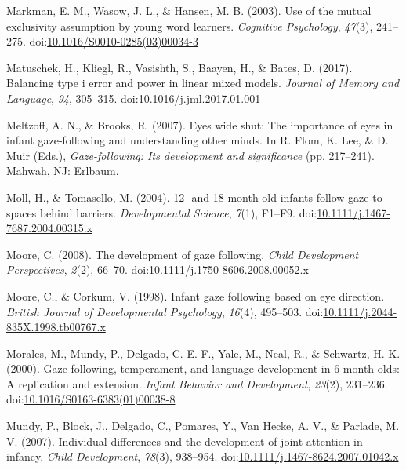 \documentclass[,man,floatsintext]{apa6}
\begin{document}
\leavevmode\hypertarget{ref-Markman_etal_2003}{}%
Markman, E. M., Wasow, J. L., \& Hansen, M. B. (2003). Use of the mutual exclusivity assumption by young word learners. \emph{Cognitive Psychology}, \emph{47}(3), 241--275. doi:\href{https://doi.org/10.1016/S0010-0285(03)00034-3}{10.1016/S0010-0285(03)00034-3}

\leavevmode\hypertarget{ref-Matuschek_etal_2017}{}%
Matuschek, H., Kliegl, R., Vasishth, S., Baayen, H., \& Bates, D. (2017). Balancing type i error and power in linear mixed models. \emph{Journal of Memory and Language}, \emph{94}, 305--315. doi:\href{https://doi.org/10.1016/j.jml.2017.01.001}{10.1016/j.jml.2017.01.001}

\leavevmode\hypertarget{ref-Meltzoff_Brooks_2007}{}%
Meltzoff, A. N., \& Brooks, R. (2007). Eyes wide shut: The importance of eyes in infant gaze-following and understanding other minds. In R. Flom, K. Lee, \& D. Muir (Eds.), \emph{Gaze-following: Its development and significance} (pp. 217--241). Mahwah, NJ: Erlbaum.

\leavevmode\hypertarget{ref-Moll_Tomasello_2004}{}%
Moll, H., \& Tomasello, M. (2004). 12- and 18-month-old infants follow gaze to spaces behind barriers. \emph{Developmental Science}, \emph{7}(1), F1--F9. doi:\href{https://doi.org/10.1111/j.1467-7687.2004.00315.x}{10.1111/j.1467-7687.2004.00315.x}

\leavevmode\hypertarget{ref-Moore_2008}{}%
Moore, C. (2008). The development of gaze following. \emph{Child Development Perspectives}, \emph{2}(2), 66--70. doi:\href{https://doi.org/10.1111/j.1750-8606.2008.00052.x}{10.1111/j.1750-8606.2008.00052.x}

\leavevmode\hypertarget{ref-Moore_Corkum_1998}{}%
Moore, C., \& Corkum, V. (1998). Infant gaze following based on eye direction. \emph{British Journal of Developmental Psychology}, \emph{16}(4), 495--503. doi:\href{https://doi.org/10.1111/j.2044-835X.1998.tb00767.x}{10.1111/j.2044-835X.1998.tb00767.x}

\leavevmode\hypertarget{ref-Morales_etal_2000}{}%
Morales, M., Mundy, P., Delgado, C. E. F., Yale, M., Neal, R., \& Schwartz, H. K. (2000). Gaze following, temperament, and language development in 6-month-olds: A replication and extension. \emph{Infant Behavior and Development}, \emph{23}(2), 231--236. doi:\href{https://doi.org/10.1016/S0163-6383(01)00038-8}{10.1016/S0163-6383(01)00038-8}

\leavevmode\hypertarget{ref-Mundy_etal_2007}{}%
Mundy, P., Block, J., Delgado, C., Pomares, Y., Van Hecke, A. V., \& Parlade, M. V. (2007). Individual differences and the development of joint attention in infancy. \emph{Child Development}, \emph{78}(3), 938--954. doi:\href{https://doi.org/10.1111/j.1467-8624.2007.01042.x}{10.1111/j.1467-8624.2007.01042.x}
\end{document}
